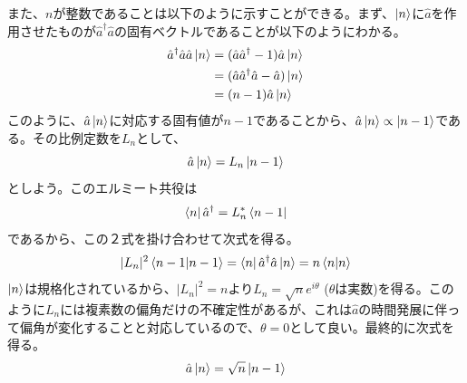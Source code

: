 また、$n$が整数であることは以下のように示すことができる。まず、$\ket n$に$\hat a$を作用させたものが$\hat a^\dagger\hat a$の固有ベクトルであることが以下のようにわかる。
\begin{equation}
	\begin{aligned}
		\hat a^\dagger \hat a \hat a \ket n &= (\hat a \hat a^\dagger -1)\hat a \ket n\\
		&= (\hat a \hat a^\dagger \hat a - \hat a)\ket n\\
		&= (n - 1)\hat a\ket n
	\end{aligned}
\end{equation}
このように、$\hat a \ket n$に対応する固有値が$n - 1$であることから、$\hat a \ket n \propto \ket {n - 1}$である。その比例定数を$L_n$として、
\begin{equation}
  \hat a \ket n = L_n\ket{n-1}
\end{equation}
としよう。このエルミート共役は
\begin{equation}
  \bra n \hat a^\dagger = L_n^*\bra{n-1}
\end{equation}
であるから、この２式を掛け合わせて次式を得る。
\begin{equation}
  |L_n|^2\braket{n-1|n-1} = \bra n \hat a^\dagger \hat a \ket n = n \braket{n|n}
\end{equation}
$\ket n$は規格化されているから、$|L_n|^2 = n$より$L_n = \sqrt n e^{i\theta}$ ($\theta$は実数)を得る。このように$L_n$には複素数の偏角だけの不確定性があるが、これは$\hat a$の時間発展に伴って偏角が変化することと対応しているので、$\theta = 0$として良い。最終的に次式を得る。
\begin{equation}
  \hat a \ket n = \sqrt n \ket {n - 1}
  \label{eq:annihilation_operator_normalization}
\end{equation}

